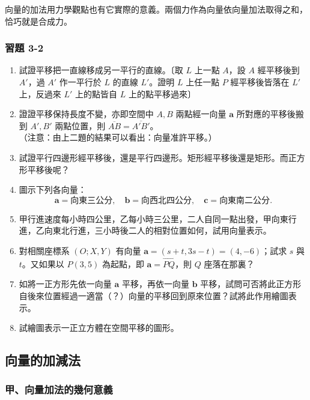 向量的加法用力學觀點也有它實際的意義。兩個力作為向量依向量加法取得之和，恰巧就是合成力。

\subsubsection*{習題 3-2}

\begin{enumerate}[label=\arabic*., leftmargin=2em]
  \item 試證平移把一直線移成另一平行的直線。〔取 $L$ 上一點 $A$，設 $A$ 經平移後到 $A'$，過 $A'$ 作一平行於 $L$ 的直線 $L'$。證明 $L$ 上任一點 $P$ 經平移後皆落在 $L'$ 上，反過來 $L'$ 上的點皆自 $L$ 上的點平移過來〕
  \item 證證平移保持長度不變，亦即空間中 $A, B$ 兩點經一向量 $\mathbf{a}$ 所對應的平移後搬到 $A', B'$ 兩點位置，則 $\overline{AB} = \overline{A'B'}$。\\
  （注意：由上二題的結果可以看出：向量准許平移。）
  \item 試證平行四邊形經平移後，還是平行四邊形。矩形經平移後還是矩形。而正方形平移後呢？
  \item 圖示下列各向量：
  \[ \mathbf{a} = \text{向東三公分}, \quad \mathbf{b} = \text{向西北四公分}, \quad \mathbf{c} = \text{向東南二公分}. \]
  \item 甲行進速度每小時四公里，乙每小時三公里，二人自同一點出發，甲向東行進，乙向東北行進，三小時後二人的相對位置如何，試用向量表示。
  \item 對相關座標系 $(O; X, Y)$ 有向量 $\mathbf{a} = (s + t, 3s - t) = (4, -6)$；試求 $s$ 與 $t$。又如果以 $P(3, 5)$ 為起點，即 $\mathbf{a} = \vec{PQ}$，則 $Q$ 座落在那裏？
  \item 如將一正方形先依一向量 $\mathbf{a}$ 平移，再依一向量 $\mathbf{b}$ 平移，試問可否將此正方形自後來位置經過一適當（？）向量的平移回到原來位置？試將此作用繪圖表示。
  \item 試繪圖表示一正立方體在空間平移的圖形。
\end{enumerate}

\subsection{向量的加減法}
\label{sec:b3s-3-3}

\subsubsection*{甲、向量加法的幾何意義}

